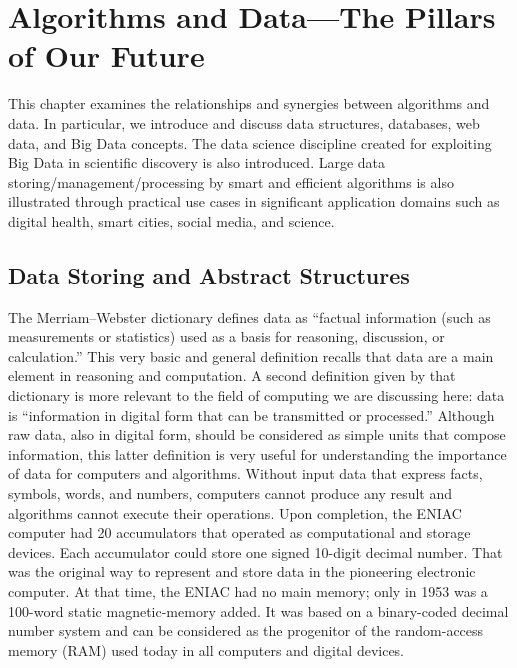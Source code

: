 




%

\setcounter{chapter}{2}

\chapter{\label{chap:3}Algorithms and Data---{\allowbreak}The Pillars of Our Future}

This chapter examines the relationships and synergies between algorithms and data. In particular, we introduce and discuss data structures, databases, web data, and Big Data concepts. The data science discipline created for exploiting Big Data in scientific discovery is also introduced. Large data storing/{\allowbreak}management/{\allowbreak}processing by smart and efficient algorithms is also illustrated through practical use cases in significant application domains such as digital health, smart cities, social media, and science.

\section{\label{sec:3.1}Data Storing and Abstract Structures}

The Merriam--Webster dictionary defines data as ``factual information (such as measurements or statistics) used as a basis for reasoning, discussion, or calculation.'' This very basic and general definition recalls that data are a main element in reasoning and computation. A second definition given by that dictionary is more relevant to the field of computing we are discussing here: data is ``information in digital form that can be transmitted or processed.'' Although raw data, also in digital form, should be considered as simple units that compose information, this latter definition is very useful for understanding the importance of data for computers and algorithms. Without input data that express facts, symbols, words, and numbers, computers cannot produce any result and algorithms cannot execute their operations. Upon completion, the ENIAC computer had 20 accumulators that operated as computational and storage devices. Each accumulator could store one signed 10-digit decimal number. That was the original way to represent and store data in the pioneering electronic computer. At that time, the ENIAC had no main memory; only in 1953 was a 100-word static magnetic-memory added. It was based on a binary-coded decimal number system and can be considered as the progenitor of the random-access memory (RAM) used today in all computers and digital devices.

